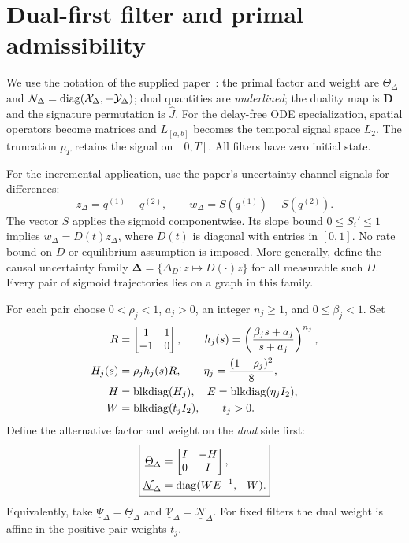 \section{Dual-first filter and primal admissibility}\label{sec:dualfirst}
We use the notation of the supplied paper~\cite{dualPIE}: the primal factor and weight are $\Theta_\Delta$ and $\mathcal N_\Delta=\operatorname{diag}(\mathcal X_\Delta,-\mathcal Y_\Delta)$; dual quantities are \emph{underlined}; the duality map is $\mathbf D$ and the signature permutation is $\hat J$. For the delay-free ODE specialization, spatial operators become matrices and $L_{[a,b]}$ becomes the temporal signal space $L_2$. The truncation $p_T$ retains the signal on $[0,T]$. All filters have zero initial state.

For the incremental application, use the paper's uncertainty-channel signals for differences:
\begin{equation}\label{eq:incrementalsignals}
 z_\Delta=q^{(1)}-q^{(2)},\qquad
 w_\Delta=S(q^{(1)})-S(q^{(2)}).
\end{equation}
The vector $S$ applies the sigmoid componentwise. Its slope bound $0\le S_i'\le1$ implies $w_\Delta=D(t)z_\Delta$, where $D(t)$ is diagonal with entries in $[0,1]$. No rate bound on $D$ or equilibrium assumption is imposed. More generally, define the causal uncertainty family $\boldsymbol\Delta=\{\Delta_D:z\mapsto D(\cdot)z\}$ for all measurable such $D$. Every pair of sigmoid trajectories lies on a graph in this family.

For each pair choose $0<\rho_j<1$, $a_j>0$, an integer $n_j\ge1$, and $0\le\beta_j<1$. Set
\begin{align}
 R&=\begin{bmatrix}1&1\\-1&0\end{bmatrix},\qquad
 h_j(s)=\left(\frac{\beta_j s+a_j}{s+a_j}\right)^{n_j},\notag\\
 H_j(s)&=\rho_j h_j(s)R,\qquad \eta_j=\frac{(1-\rho_j)^2}{8},\notag\\
 H&=\operatorname{blkdiag}(H_j),\quad E=\operatorname{blkdiag}(\eta_jI_2),\notag\\
 W&=\operatorname{blkdiag}(t_jI_2),\qquad t_j>0.
\end{align}
Define the alternative factor and weight on the \emph{dual} side first:
\begin{equation}\label{eq:dualfirst}
 \boxed{\begin{aligned}
 \underline\Theta_\Delta&=\begin{bmatrix}I&-H\\0&I\end{bmatrix},\\
 \underline{\mathcal N}_\Delta&=\operatorname{diag}(WE^{-1},-W).
 \end{aligned}}
\end{equation}
Equivalently, take $\underline\Psi_\Delta=\underline\Theta_\Delta$ and $\underline{\mathcal V}_\Delta=\underline{\mathcal N}_\Delta$. For fixed filters the dual weight is affine in the positive pair weights $t_j$.

